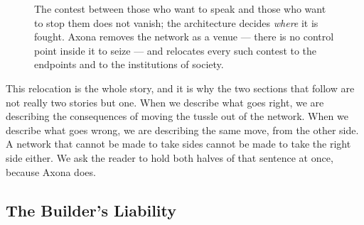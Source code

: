 \documentclass[nobib,justified]{tufte-handout}
\begin{document}
\begin{figure}[h]
\centering
{}
\caption[Relocating the tussle]{The contest between those who want to speak and
those who want to stop them does not vanish; the architecture decides
\emph{where} it is fought. Axona removes the network as a venue --- there is no
control point inside it to seize --- and relocates every such contest to the
endpoints and to the institutions of society.}
\label{fig:tussle}
\end{figure}

This relocation is the whole story, and it is why the two sections that follow
are not really two stories but one. When we describe what goes right, we are
describing the consequences of moving the tussle out of the network. When we
describe what goes wrong, we are describing the same move, from the other side.
A network that cannot be made to take sides cannot be made to take the right side
either. We ask the reader to hold both halves of that sentence at once, because
Axona does.

\subsection{The Builder's Liability}
\end{document}
